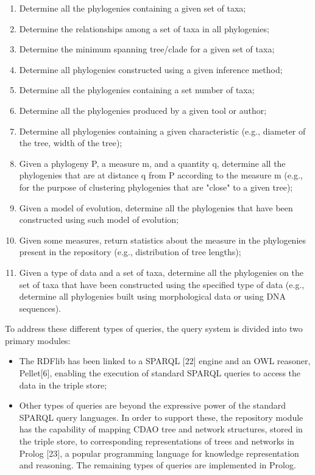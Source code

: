 \documentclass[10pt]{article}
\begin{document}
\begin{enumerate}
\item Determine all the phylogenies containing a given set of taxa;
\item Determine the relationships among a set of taxa in all phylogenies;
\item Determine the minimum spanning tree/clade for a given set of taxa;
\item Determine all phylogenies constructed using a given inference method;
\item Determine all the phylogenies containing a set number of taxa;
\item Determine all the phylogenies produced by a given tool or author;
\item Determine all phylogenies containing a given characteristic (e.g.,
diameter of the tree, width of the tree);
\item Given a phylogeny P, a measure m, and a quantity q, determine all the
phylogenies that are at distance q from P according to the measure m (e.g., for
the purpose of clustering phylogenies that are "close" to a given tree);
\item Given a model of evolution, determine all the phylogenies that have been
constructed using such model of evolution;
\item Given some measures, return statistics about the measure in the
phylogenies present in the repository (e.g., distribution of tree lengths);
\item Given a type of data and a set of taxa, determine all the phylogenies on
the set of taxa that have been constructed using the specified type of data
(e.g., determine all phylogenies built using morphological data or using DNA
sequences).
\end{enumerate}
To address these different types of queries, the query system is divided into two primary modules:
\begin{itemize}
\item The RDFlib has been linked to a SPARQL [22] engine and an OWL reasoner,
Pellet[6], enabling the execution of standard SPARQL queries to access the data
in the triple store;
\item Other types of queries are beyond the expressive power of the standard
SPARQL query languages. In order to support these, the repository module has
the capability of mapping CDAO tree and network structures, stored in the
triple store, to corresponding representations of trees and networks in Prolog
[23], a popular programming language for knowledge representation and
reasoning. The remaining types of queries are implemented in Prolog.
\end{itemize}
\end{document}
